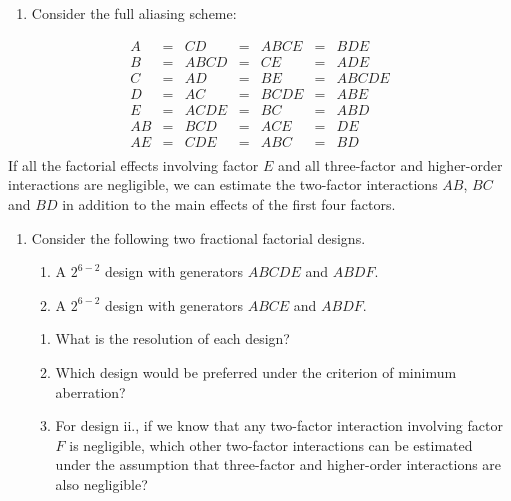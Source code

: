 \documentclass[
]{book}
\providecommand{\tightlist}{%
  \setlength{\itemsep}{0pt}\setlength{\parskip}{0pt}}
\theoremstyle{definition}
\theoremstyle{definition}
\theoremstyle{definition}
\theoremstyle{definition}
\theoremstyle{remark}
\begin{document}
\begin{enumerate}
\def\labelenumi{\alph{enumi}.}
\setcounter{enumi}{1}
\tightlist
\item
  Consider the full aliasing scheme:
\end{enumerate}

\[
\begin{array}{ccccccc}
A & = & CD & = & ABCE & = & BDE \\
B & = & ABCD & = & CE & = & ADE \\
C & = & AD & = & BE & = & ABCDE \\ 
D & = & AC & = & BCDE & = & ABE \\
E & = & ACDE & = & BC & = & ABD \\
AB & = & BCD & = & ACE & = & DE \\
AE & = & CDE & = & ABC & = & BD \\ 
\end{array}
\]
If all the factorial effects involving factor \(E\) and all three-factor and higher-order interactions are negligible, we can estimate the two-factor interactions \(AB\), \(BC\) and \(BD\) in addition to the main effects of the first four factors.

\begin{enumerate}
\def\labelenumi{\arabic{enumi}.}
\setcounter{enumi}{1}
\item
  Consider the following two fractional factorial designs.

  \begin{enumerate}
  \def\labelenumii{\roman{enumii}.}
  \tightlist
  \item
    A \(2^{6-2}\) design with generators \(ABCDE\) and \(ABDF\).
  \item
    A \(2^{6-2}\) design with generators \(ABCE\) and \(ABDF\).
  \end{enumerate}

  \begin{enumerate}
  \def\labelenumii{\alph{enumii}.}
  \item
    What is the resolution of each design?
  \item
    Which design would be preferred under the criterion of minimum aberration?
  \item
    For design ii., if we know that any two-factor interaction involving factor \(F\) is negligible, which other two-factor interactions can be estimated under the assumption that three-factor and higher-order interactions are also negligible?
  \end{enumerate}
\end{enumerate}
\end{document}
